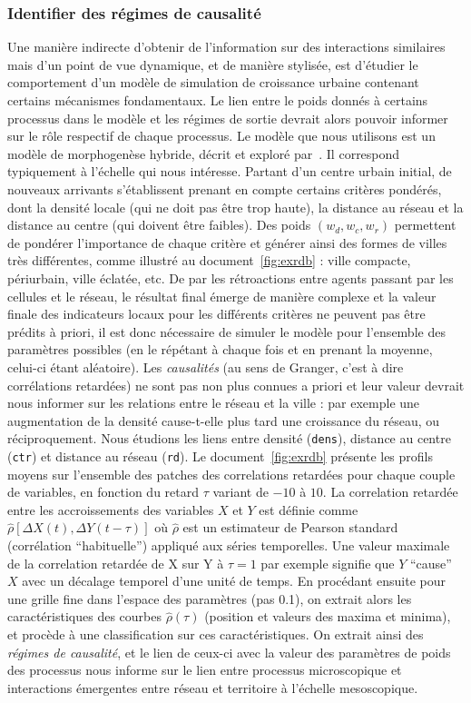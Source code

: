 \subsubsection{Identifier des régimes de causalité}

Une manière indirecte d'obtenir de l'information sur des interactions similaires mais d'un point de vue dynamique, et de manière stylisée, est d'étudier le comportement d'un modèle de simulation de croissance urbaine contenant certains mécanismes fondamentaux. Le lien entre le poids donnés à certains processus dans le modèle et les régimes de sortie devrait alors pouvoir informer sur le rôle respectif de chaque processus. Le modèle que nous utilisons est un modèle de morphogenèse hybride, décrit et exploré par~\cite{raimbault2014hybrid}. Il correspond typiquement à l'échelle qui nous intéresse. Partant d'un centre urbain initial, de nouveaux arrivants s'établissent prenant en compte certains critères pondérés, dont la densité locale (qui ne doit pas être trop haute), la distance au réseau et la distance au centre (qui doivent être faibles). Des poids $(w_{d},w_{c},w_{r})$ permettent de pondérer l'importance de chaque critère et générer ainsi des formes de villes très différentes, comme illustré au document~\ref{fig:exrdb} : ville compacte, périurbain, ville éclatée, etc. De par les rétroactions entre agents passant par les cellules et le réseau, le résultat final émerge de manière complexe et la valeur finale des indicateurs locaux pour les différents critères ne peuvent pas être prédits à priori, il est donc nécessaire de simuler le modèle pour l'ensemble des paramètres possibles (en le répétant à chaque fois et en prenant la moyenne, celui-ci étant aléatoire). Les \emph{causalités} (au sens de Granger, c'est à dire corrélations retardées) ne sont pas non plus connues a priori et leur valeur devrait nous informer sur les relations entre le réseau et la ville : par exemple une augmentation de la densité cause-t-elle plus tard une croissance du réseau, ou réciproquement. Nous étudions les liens entre densité (\texttt{dens}), distance au centre (\texttt{ctr}) et distance au réseau (\texttt{rd}). Le document~\ref{fig:exrdb} présente les profils moyens sur l'ensemble des patches des correlations retardées pour chaque couple de variables, en fonction du retard $\tau$ variant de $-10$ à $10$. La correlation retardée entre les accroissements des variables $X$ et $Y$ est définie comme $\hat{\rho}\left[\Delta X(t),\Delta Y(t-\tau)\right]$ où $\hat{\rho}$ est un estimateur de Pearson standard (corrélation ``habituelle'') appliqué aux séries temporelles. Une valeur maximale de la correlation retardée de X sur Y à $\tau = 1$ par exemple signifie que $Y$ ``cause'' $X$ avec un décalage temporel d'une unité de temps. En procédant ensuite pour une grille fine dans l'espace des paramètres (pas 0.1), on extrait alors les caractéristiques des courbes $\hat{\rho}(\tau)$ (position et valeurs des maxima et minima), et procède à une classification sur ces caractéristiques. On extrait ainsi des \emph{régimes de causalité}, et le lien de ceux-ci avec la valeur des paramètres de poids des processus nous informe sur le lien entre processus microscopique et interactions émergentes entre réseau et territoire à l'échelle mesoscopique.

